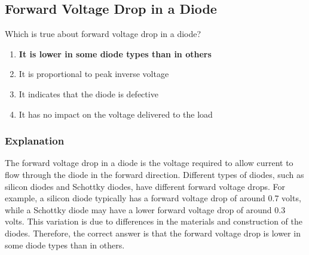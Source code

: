 \subsection{Forward Voltage Drop in a Diode}
\label{T6B01}

\begin{tcolorbox}[colback=gray!10!white,colframe=black!75!black,title=T6B01]
Which is true about forward voltage drop in a diode?
\begin{enumerate}[noitemsep]
    \item \textbf{It is lower in some diode types than in others}
    \item It is proportional to peak inverse voltage
    \item It indicates that the diode is defective
    \item It has no impact on the voltage delivered to the load
\end{enumerate}
\end{tcolorbox}

\subsubsection*{Explanation}
The forward voltage drop in a diode is the voltage required to allow current to flow through the diode in the forward direction. Different types of diodes, such as silicon diodes and Schottky diodes, have different forward voltage drops. For example, a silicon diode typically has a forward voltage drop of around 0.7 volts, while a Schottky diode may have a lower forward voltage drop of around 0.3 volts. This variation is due to differences in the materials and construction of the diodes. Therefore, the correct answer is that the forward voltage drop is lower in some diode types than in others.